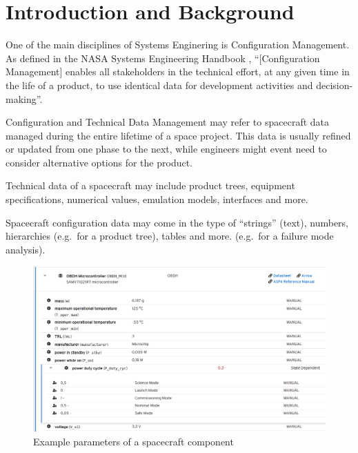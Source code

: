 \documentclass[]{iac}
\def\todo#1{}
\begin{document}
\section{Introduction and Background}
One of the main disciplines of Systems Enginering is Configuration Management. As defined in the NASA Systems Engineering Handbook \autocite{shea_nasa_2020}, ``[Configuration Management] enables all stakeholders in the technical effort, at any given time in the life of a product, to use identical data for development activities and decision-making''.

Configuration and Technical Data Management may refer to spacecraft data managed during the entire lifetime of a space project. This data is usually refined or updated from one phase to the next, while engineers might event need to consider alternative options for the product.

Technical data of a spacecraft may include product trees, equipment specifications, numerical values, emulation models, interfaces and more. \todo{todo} \todo{This work focuses on numerical values}

Spacecraft configuration data may come in the type of ``strings'' (text), numbers, hierarchies (e.g.~for a product tree), tables and more. (e.g.~for a failure mode analysis). \begin{figure}[h]
    \centering
    \includegraphics[width=.7\linewidth]{media/ocdt_dist_wv_2.png}
    \caption{Example parameters of a spacecraft component \autocite{DDJF_OBDH}} %
    \label{fig:ocdt_webview_example}
\end{figure}
\end{document}
